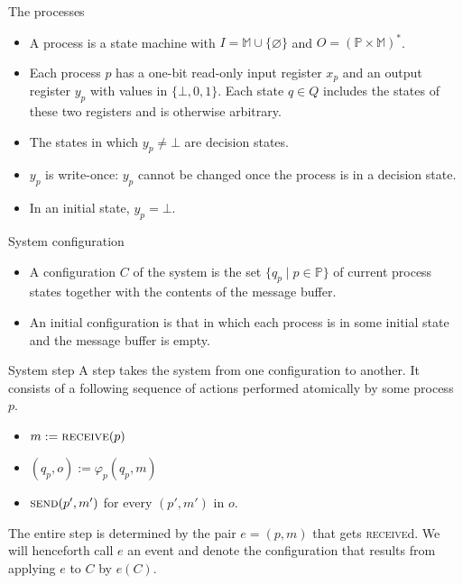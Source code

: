 \documentclass{beamer}
\begin{document}
\begin{frame}{The processes}
  \begin{itemize}
    \item A process is a state machine with $I = \mathbb{M} \cup \{ \varnothing \}$ and $O = (\mathbb{P} \times \mathbb{M})^*$.
    \item Each process $p$ has a one-bit read-only \alert{input register} $x_p$ and an \alert{output register} $y_p$ with values in $\{ \bot, 0, 1\}$. Each state $q \in Q$ includes the states of these two registers and is otherwise arbitrary.
    \item The states in which $y_p \ne \bot$ are \alert{decision states}.
    \item $y_p$ is \alert{write-once}: $y_p$ cannot be changed once the process is in a decision state.
    \item In an \alert{initial state}, $y_p = \bot$.
  \end{itemize}
\end{frame}

\begin{frame}{System configuration}
  \begin{itemize}
    \item A configuration $C$ of the system is the set $\{ q_p \mid p \in \mathbb{P} \}$ of current process states together with the contents of the message buffer.
    \item An \alert{initial configuration} is that in which each process is in some initial state and the message buffer is empty.
  \end{itemize}
\end{frame}

\begin{frame}{System step}
  A step takes the system from one configuration to another. It consists of a following sequence of actions performed atomically by some process $p$.
  \begin{itemize}
    \item $m := \textsc{receive}(p)$
    \item $(q_p, o) := \varphi_p(q_p, m)$
    \item $\textsc{send}(p', m')$ for every $(p', m')$ in $o$.
  \end{itemize}
  The entire step is determined by the pair $e = (p, m)$ that gets \textsc{receive}d. We will henceforth call $e$ an \alert{event} and denote the configuration that results from applying $e$ to $C$ by $e(C)$.
\end{frame}

%
\end{document}
